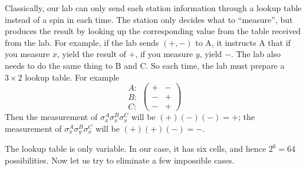 \documentclass{article}
\begin{document}
Classically, our lab can only send each station information
through a lookup table instead of a spin in each time.
%
The station only decides what to ``measure'',
but produces the result by looking up the corresponding
value from the table received from the lab.
%
For example, if the lab sends $(+, -)$ to A, it instructs A that
if you measure $x$, yield the result of $+$, if you measure $y$, yield $-$.
The lab also needs to do the same thing to B and C.
So each time, the lab must prepare a $3 \times 2$ lookup table. For example
$$
\begin{array}{ccc}
A: \\
B: \\
C:
\end{array}
\left(\begin{array}{ccc}
+ & - \\
- & + \\
- & +
\end{array}\right)
$$
Then the measurement of
$\sigma^A_x \sigma^B_x \sigma^C_x$
will be $(+) (-) (-) = +$;
the measurement of $\sigma^A_x \sigma^B_y \sigma^C_x$
will be $(+) (+) (-) = -$.


The lookup table is only variable.
In our case, it has six cells, and hence $2^6 = 64$ possibilities.
Now let us try to eliminate a few impossible cases.
\end{document}
